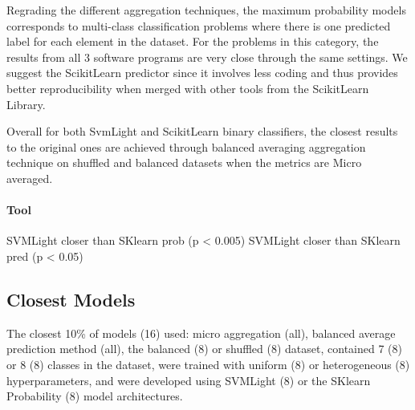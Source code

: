 Regrading the different aggregation techniques, the maximum probability models corresponds to multi-class classification 
problems where there is one predicted label for each element in the dataset. For the problems in this category, 
the results from all 3 software programs are very close through the same settings. We suggest the ScikitLearn predictor 
since it involves less coding and thus provides better reproducibility when merged with other tools from the ScikitLearn Library.

Overall for both SvmLight and ScikitLearn binary classifiers, the closest results to the original ones are achieved through
balanced averaging aggregation technique on shuffled and balanced datasets when the metrics are Micro averaged.

\paragraph{Tool}
SVMLight closer than SKlearn prob (p < 0.005)
SVMLight closer than SKlearn pred (p < 0.05)

\subsection{Closest Models}
The closest 10\% of models (16) used: micro aggregation (all), balanced average prediction method (all), the balanced (8)
or shuffled (8) dataset, contained 7 (8) or 8 (8) classes in the dataset, were trained with uniform (8) or
heterogeneous (8) hyperparameters, and were developed using SVMLight (8) or the SKlearn Probability (8) model
architectures.






